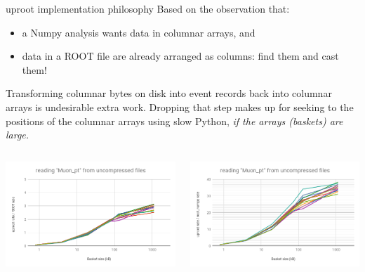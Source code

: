 \documentclass[aspectratio=169]{beamer}
\begin{document}


\begin{frame}{uproot implementation philosophy}
\vspace{0.4 cm}
Based on the observation that:
\begin{itemize}
\item a Numpy analysis wants data in columnar arrays, and
\item data in a ROOT file are already arranged as columns: find them and cast them!
\end{itemize}

\vspace{0.2 cm}
Transforming columnar bytes on disk into event records back into columnar arrays is undesirable extra work. Dropping that step makes up for seeking to the positions of the columnar arrays using slow Python, {\it if the arrays (baskets) are large.}

\vspace{0.1 cm}
\begin{columns}
\includegraphics[width=\linewidth]{root-none-muon.png}

\includegraphics[width=\linewidth]{rootnumpy-none-muon.png}
\end{columns}
\end{frame}
\end{document}
